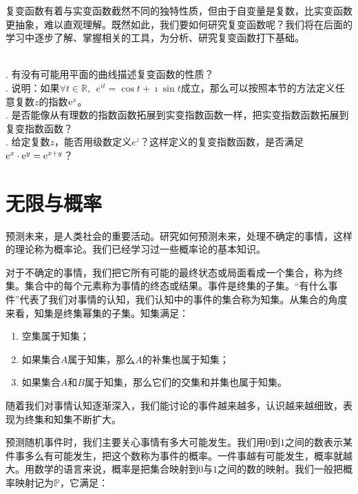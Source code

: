 \documentclass[12pt,UTF8]{ctexbook}
\begin{document}
复变函数有着与实变函数截然不同的独特性质，但由于自变量是复数，比实变函数更抽象，难以直观理解。既然如此，我们要如何研究复变函数呢？我们将在后面的学习中逐步了解、掌握相关的工具，为分析、研究复变函数打下基础。

\begin{sk}
    \mbox{} \\
    . 有没有可能用平面的曲线描述复变函数的性质？\\
    . 说明：如果$\forall t\in\mathbb{R}, \;\,e^{it} = \cos{t} + \imath \sin{t}$成立，那么可以按照本节的方法定义任意复数$z$的指数$\mathrm{e}^z$。\\
    . 是否能像从有理数的指数函数拓展到实变指数函数一样，把实变指数函数拓展到复变指数函数？\\
    . 给定复数$z$，能否用级数定义$e^z$？这样定义的复变指数函数，是否满足$\mathrm{e}^x\cdot \mathrm{e}^y = \mathrm{e}^{x + y}$？
\end{sk}


\chapter{无限与概率}

预测未来，是人类社会的重要活动。研究如何预测未来，处理不确定的事情，这样的理论称为概率论。我们已经学习过一些概率论的基本知识。

对于不确定的事情，我们把它所有可能的最终状态或局面看成一个集合，称为终集。集合中的每个元素称为事情的终态或结果。事件是终集的子集。“有什么事件”代表了我们对事情的认知，我们认知中的事件的集合称为知集。从集合的角度来看，知集是终集幂集的子集。知集满足：

\begin{enumerate}
    \item 空集属于知集；
    \item 如果集合$A$属于知集，那么$A$的补集也属于知集；
    \item 如果集合$A$和$B$属于知集，那么它们的交集和并集也属于知集。
\end{enumerate}

随着我们对事情认知逐渐深入，我们能讨论的事件越来越多，认识越来越细致，表现为终集和知集不断扩大。

预测随机事件时，我们主要关心事情有多大可能发生。我们用$0$到$1$之间的数表示某件事多么有可能发生，把这个数称为事件的概率。一件事越有可能发生，概率就越大。用数学的语言来说，概率是把集合映射到$0$与$1$之间的数的映射。我们一般把概率映射记为$\mathbb{P}$，它满足：
\end{document}
